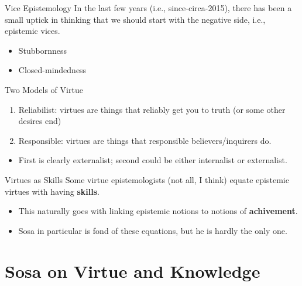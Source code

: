 \documentclass[
  17pt,
  letterpaper,
  ignorenonframetext,
  aspectratio=169,
  handout]{beamer}
\providecommand{\tightlist}{%
  \setlength{\itemsep}{0pt}\setlength{\parskip}{0pt}}\usepackage{longtable,booktabs,array}
\begin{document}
\begin{frame}{Vice Epistemology}
\protect\hypertarget{vice-epistemology}{}
In the last few years (i.e., since-circa-2015), there has been a small
uptick in thinking that we should start with the negative side, i.e.,
epistemic vices.

\begin{itemize}[<+->]
\tightlist
\item
  Stubbornness
\item
  Closed-mindedness
\end{itemize}
\end{frame}

\begin{frame}{Two Models of Virtue}
\protect\hypertarget{two-models-of-virtue}{}
\begin{enumerate}[<+->]
\tightlist
\item
  Reliabilist: virtues are things that reliably get you to truth (or
  some other desires end)
\item
  Responsible: virtues are things that responsible believers/inquirers
  do.
\end{enumerate}

\begin{itemize}[<+->]
\tightlist
\item
  First is clearly externalist; second could be either internalist or
  externalist.
\end{itemize}
\end{frame}

\begin{frame}{Virtues as Skills}
\protect\hypertarget{virtues-as-skills}{}
Some virtue epistemologists (not all, I think) equate epistemic virtues
with having \textbf{skills}.

\begin{itemize}[<+->]
\tightlist
\item
  This naturally goes with linking epistemic notions to notions of
  \textbf{achivement}.
\item
  Sosa in particular is fond of these equations, but he is hardly the
  only one.
\end{itemize}
\end{frame}

\hypertarget{sosa-on-virtue-and-knowledge}{%
\section{Sosa on Virtue and
Knowledge}\label{sosa-on-virtue-and-knowledge}}
\end{document}
